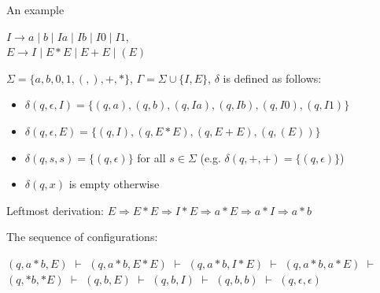 \documentclass[handout]{beamer}
\begin{document}
\begin{frame}{An example}

    \begin{example}
        $I\rightarrow a\mid b\mid Ia\mid Ib\mid I0\mid I1$,\\
        $E\rightarrow I\mid E*E\mid E+E\mid (E)$
    \end{example}
        
    $\Sigma=\{a,b,0,1,(,),+,*\}$, $\Gamma=\Sigma\cup\{I,E\}$,  $\delta$ is defined as follows:

    \begin{itemize}
        \item $\delta(q,\epsilon,I)=\{(q,a),(q,b),(q,Ia),(q,Ib),(q,I0),(q,I1)\}$
        \item $\delta(q,\epsilon,E)=\{(q,I),(q,E*E),(q,E+E),(q,(E))\}$
        \item $\delta(q,s,s)=\{(q,\epsilon)\}$ for all $s\in \Sigma$ (e.g. $\delta(q,+,+)=\{(q,\epsilon)\}$)
        \item $\delta(q,x)$ is empty otherwise
    \end{itemize}

    \alert{Leftmost derivation:} $E\Rightarrow E*E\Rightarrow I*E\Rightarrow a*E\Rightarrow a*I\Rightarrow a*b$\\       	
    
    \medskip

    The sequence of configurations:

    $(q,a*b,E)$
    $\vdash$ $(q,a*b,E*E)$
    $\vdash$ $(q,a*b,I*E)$
    $\vdash$ $(q,a*b,a*E)$
    $\vdash$ $(q,*b,*E)$
    $\vdash$ $(q,b,E)$
    $\vdash$ $(q,b,I)$
    $\vdash$ $(q,b,b)$
    $\vdash$ $(q,\epsilon,\epsilon)$

\end{frame}
\end{document}
